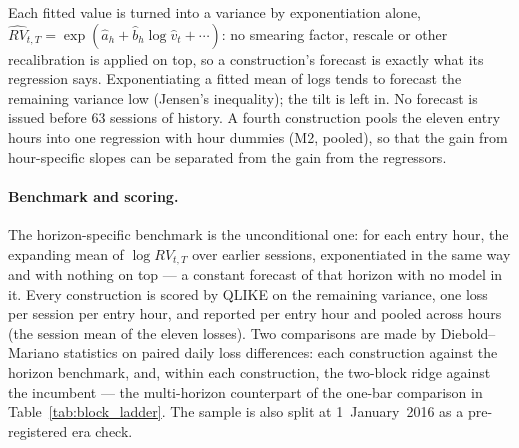 Each fitted value is turned into a variance by exponentiation alone,
$\widehat{RV}_{t,T} = \exp(\hat a_h + \hat b_h \log \hat v_t + \cdots)$:
no smearing factor, rescale or other recalibration is applied on top,
so a construction's forecast is exactly what its regression says.
Exponentiating a fitted mean of logs tends to forecast the remaining
variance low (Jensen's inequality); the tilt is left in. No forecast is
issued before $63$ sessions of history.
A fourth construction pools the eleven entry hours into one regression
with hour dummies (M2, pooled), so that the gain from hour-specific
slopes can be separated from the gain from the regressors.


\paragraph{Benchmark and scoring.} The horizon-specific benchmark is
the unconditional one: for each entry hour, the expanding mean of
$\log RV_{t,T}$ over earlier sessions, exponentiated in the same way
and with nothing on top --- a constant forecast of that horizon with
no model in it.
Every construction is scored by QLIKE \citep{Patton2011} on the
remaining variance, one loss per session per entry hour, and reported
per entry hour and pooled across hours (the session mean of the eleven
losses). Two comparisons are made by Diebold--Mariano statistics
\citep{DieboldMariano1995} on paired daily loss differences: each
construction against the horizon benchmark, and, within each
construction, the two-block ridge against the incumbent --- the
multi-horizon counterpart of the one-bar comparison in
Table~\ref{tab:block_ladder}. The sample is also split at
1~January~2016 as a pre-registered era check.

